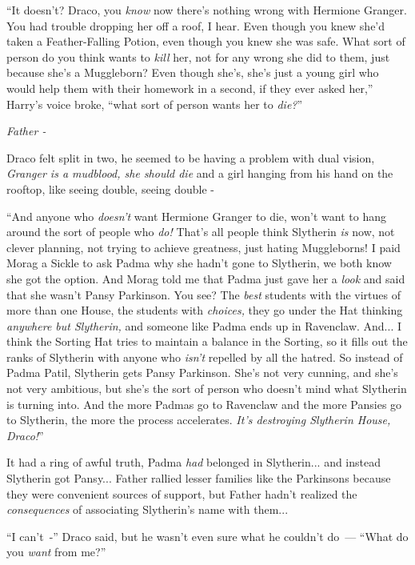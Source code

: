 ``It doesn't? Draco, you \emph{know} now there's nothing wrong with Hermione Granger. You had trouble dropping her off a roof, I hear. Even though you knew she'd taken a Feather-Falling Potion, even though you knew she was safe. What sort of person do you think wants to \emph{kill} her, not for any wrong she did to them, just because she's a Muggleborn? Even though she's, she's just a young girl who would help them with their homework in a second, if they ever asked her,'' Harry's voice broke, ``what sort of person wants her to \emph{die?}''

\emph{Father -}

Draco felt split in two, he seemed to be having a problem with dual vision, \emph{Granger is a mudblood, she should die} and a girl hanging from his hand on the rooftop, like seeing double, seeing double -

``And anyone who \emph{doesn't} want Hermione Granger to die, won't want to hang around the sort of people who \emph{do!} That's all people think Slytherin \emph{is} now, not clever planning, not trying to achieve greatness, just hating Muggleborns! I paid Morag a Sickle to ask Padma why she hadn't gone to Slytherin, we both know she got the option. And Morag told me that Padma just gave her a \emph{look} and said that she wasn't Pansy Parkinson. You see? The \emph{best} students with the virtues of more than one House, the students with \emph{choices,} they go under the Hat thinking \emph{anywhere but Slytherin,} and someone like Padma ends up in Ravenclaw. And... I think the Sorting Hat tries to maintain a balance in the Sorting, so it fills out the ranks of Slytherin with anyone who \emph{isn't} repelled by all the hatred. So instead of Padma Patil, Slytherin gets Pansy Parkinson. She's not very cunning, and she's not very ambitious, but she's the sort of person who doesn't mind what Slytherin is turning into. And the more Padmas go to Ravenclaw and the more Pansies go to Slytherin, the more the process accelerates. \emph{It's destroying Slytherin House, Draco!}''

It had a ring of awful truth, Padma \emph{had} belonged in Slytherin... and instead Slytherin got Pansy... Father rallied lesser families like the Parkinsons because they were convenient sources of support, but Father hadn't realized the \emph{consequences} of associating Slytherin's name with them...

``I can't~-'' Draco said, but he wasn't even sure what he couldn't do~--- ``What do you \emph{want} from me?''

